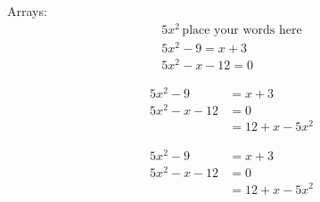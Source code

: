 \documentclass[11pt]{article}
\begin{document}
Arrays:
\begin{align}
5x^2\, \text{place your words here}\\
5x^2-9=x+3\\
5x^2-x-12=0
\end{align}

\begin{align*}
5x^2-9&=x+3\\
5x^2-x-12&=0\\
&= 12 + x - 5x^2
\end{align*}

\begin{align}
5x^2-9&=x+3\\
5x^2-x-12&=0\\
&= 12 + x - 5x^2
\end{align}
\end{document}
